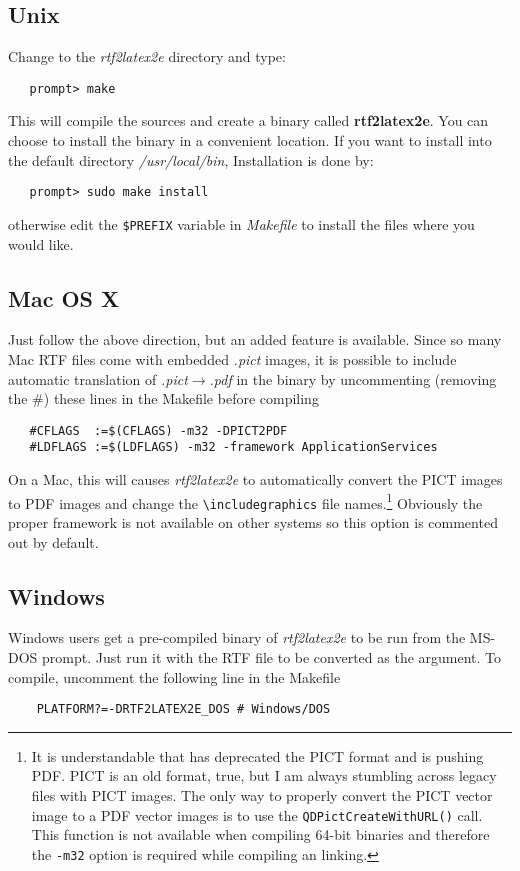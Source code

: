 \documentclass{article}
\def\rtf2latex2e{{\it rtf2latex2e}}
\begin{document}
\subsection{Unix \label{Unix_install}}
Change to the \textit{rtf2latex2e} directory and type:
\begin{verbatim}
   prompt> make
\end{verbatim}
This will compile the sources and create a binary called
\textbf{rtf2latex2e}.
You can choose to install the binary in a convenient location.
If you want to install into the default directory
\textit{/usr/local/bin},
Installation is done by:
\begin{verbatim}
   prompt> sudo make install
\end{verbatim}
otherwise edit the \texttt{\$PREFIX} variable in \textit{Makefile}
to install the files where you would like. 

\subsection{Mac OS X}
Just follow the above direction, but an added feature is available.
Since so many Mac RTF files come with embedded \textit{.pict} images, 
it is possible to include automatic translation of \textit{.pict}$\rightarrow$\textit{.pdf}
in the binary by uncommenting (removing the \#) these lines in the Makefile before
compiling
\begin{verbatim}
   #CFLAGS  :=$(CFLAGS) -m32 -DPICT2PDF
   #LDFLAGS :=$(LDFLAGS) -m32 -framework ApplicationServices
\end{verbatim}
On a Mac, this will causes {\rtf2latex2e} to automatically convert the PICT images to PDF images
and change the \verb#\includegraphics# file names.\footnote{It is understandable that 
has deprecated the PICT format and is pushing PDF.  PICT is an old format, true,
but I am always stumbling across legacy files with PICT images.  The only way to properly
convert the PICT vector image to a PDF vector images is to use the \texttt{QDPictCreateWithURL()}
call.  This function is not available when compiling 64-bit binaries and therefore the \texttt{-m32}
option is required while compiling an linking. }  Obviously the proper framework is
not available on other systems so this option is commented out by default.

\subsection{Windows}
Windows users get a pre-compiled binary of \rtf2latex2e to be run from
the MS-DOS prompt. Just run it with the RTF file to be converted as the argument.
To compile, uncomment the following line in the Makefile
\begin{verbatim}
    PLATFORM?=-DRTF2LATEX2E_DOS # Windows/DOS
\end{verbatim}
\end{document}
